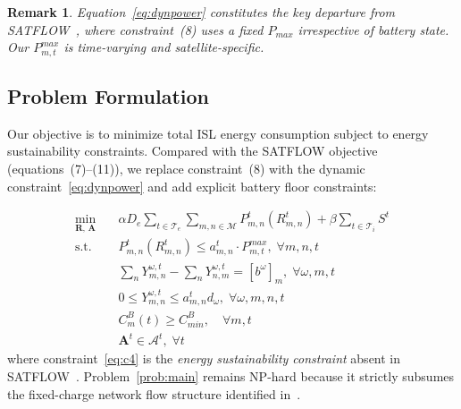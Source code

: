 \documentclass[journal]{IEEEtran}
\newtheorem{remark}{Remark}
\newcommand{\CB}{C^{B}}
\newcommand{\CBmin}{C^{B}_{min}}
\newcommand{\Pmax}{P_{max}}
\newcommand{\calM}{\mathcal{M}}
\newcommand{\bfR}{\mathbf{R}}
\newcommand{\Rmn}{R_{m,n}^{t}}
\begin{document}
\begin{remark}
Equation~\eqref{eq:dynpower} constitutes the key departure from SATFLOW~\cite{cen2024satflow}, where constraint~(8) uses a fixed $\Pmax$ irrespective of battery state. Our $P_{m,t}^{max}$ is time-varying and satellite-specific.
\end{remark}

\subsection{Problem Formulation}

Our objective is to minimize total ISL energy consumption subject to energy sustainability constraints. Compared with the SATFLOW objective~\cite{cen2024satflow} (equations~(7)--(11)), we replace constraint~(8) with the dynamic constraint~\eqref{eq:dynpower} and add explicit battery floor constraints:

\begin{subequations}
\label{prob:main}
\begin{align}
    \min_{\bfR,\,\mathbf{A}} \quad &
    \alpha D_e \sum_{t\in\mathcal{T}_e}
    \sum_{m,n\in\calM} P_{m,n}^t\!\left(\Rmn\right)
    + \beta\sum_{t\in\mathcal{T}_i} S^t
    \label{eq:obj}\\
    \text{s.t.} \quad &
    P_{m,n}^t\!\left(\Rmn\right) \leq
    a_{m,n}^t \cdot P_{m,t}^{max},
    \;\forall m,n,t
    \label{eq:c1}\\
    & \sum_{n} Y_{m,n}^{\omega,t} -
    \sum_{n} Y_{n,m}^{\omega,t} = [b^\omega]_m,
    \;\forall\omega,m,t
    \label{eq:c2}\\
    & 0\leq Y_{m,n}^{\omega,t} \leq
    a_{m,n}^t d_\omega,
    \;\forall\omega,m,n,t
    \label{eq:c3}\\
    & \CB_m(t) \geq \CBmin, \quad\forall m,t
    \label{eq:c4}\\
    & \mathbf{A}^t \in \mathscr{A}^t,
    \;\forall t
    \label{eq:c5}
\end{align}
\end{subequations}
where constraint~\eqref{eq:c4} is the \emph{energy sustainability constraint} absent in SATFLOW~\cite{cen2024satflow}. Problem~\eqref{prob:main} remains NP-hard because it strictly subsumes the fixed-charge network flow structure identified in~\cite{cen2024satflow}.
\end{document}

